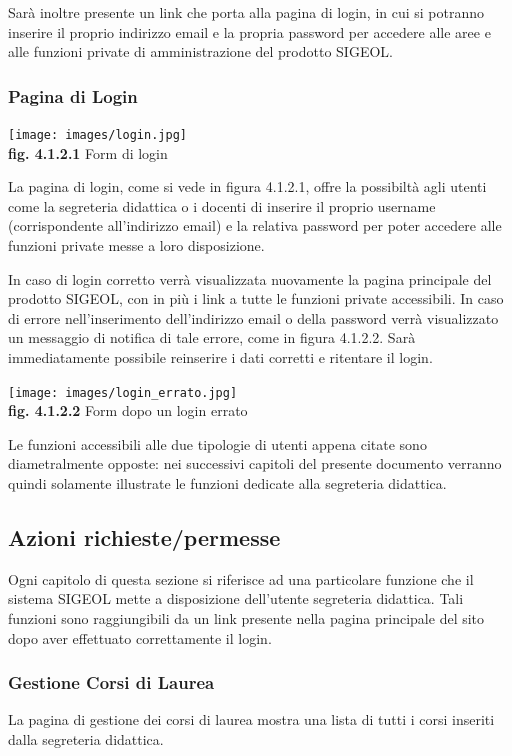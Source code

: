 \documentclass[11pt,a4paper]{article}
\begin{document}
Sarà inoltre presente un link che porta alla pagina di login, in cui si potranno inserire il proprio indirizzo email e la propria password per accedere alle aree e alle funzioni private di amministrazione del prodotto SIGEOL.
\subsubsection{Pagina di Login}

\begin{center}
	\texttt{[image: images/login.jpg]}\\
	\textbf{fig. 4.1.2.1} Form di login\\
\end{center}

La pagina di login, come si vede in figura 4.1.2.1, offre la possibiltà agli utenti come la segreteria didattica o i docenti di inserire il proprio username (corrispondente all'indirizzo email) e la relativa password per poter accedere alle funzioni private messe a loro disposizione.

In caso di login corretto verrà visualizzata nuovamente la pagina principale del prodotto SIGEOL, con in più i link a tutte le funzioni private accessibili.
In caso di errore nell'inserimento dell'indirizzo email o della password verrà visualizzato un messaggio di notifica di tale errore, come in figura 4.1.2.2.
Sarà immediatamente possibile reinserire i dati corretti e ritentare il login.

\begin{center}
	\texttt{[image: images/login\_errato.jpg]}\\
	\textbf{fig. 4.1.2.2} Form dopo un login errato\\
\end{center}

Le funzioni accessibili alle due tipologie di utenti appena citate sono diametralmente opposte: nei successivi capitoli del presente documento verranno quindi solamente illustrate le funzioni dedicate alla segreteria didattica.
\subsection{Azioni richieste/permesse}
Ogni capitolo di questa sezione si riferisce ad una particolare funzione che il sistema SIGEOL mette a disposizione dell'utente segreteria didattica. Tali funzioni sono raggiungibili da un link presente nella pagina principale del sito dopo aver effettuato correttamente il login.
\subsubsection{Gestione Corsi di Laurea}
La pagina di gestione dei corsi di laurea mostra una lista di tutti i corsi inseriti dalla segreteria didattica.
\end{document}
